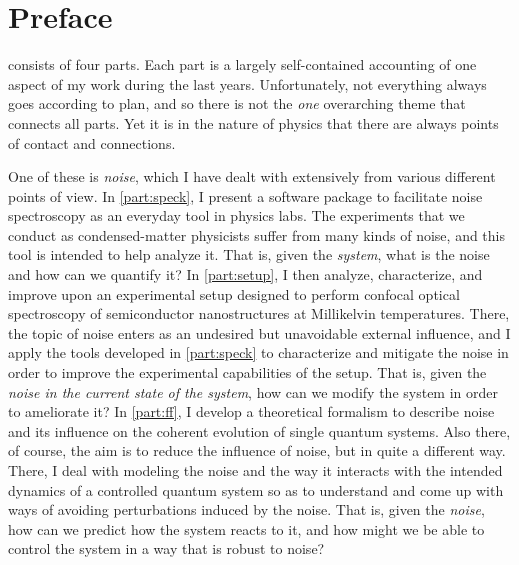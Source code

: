 \chapter*{Preface}

\Thethesis consists of four parts.
Each part is a largely self-contained accounting of one aspect of my work during the last years.
Unfortunately, not everything always goes according to plan, and so there is not the \emph{one} overarching theme that connects all parts.
Yet it is in the nature of physics that there are always points of contact and connections.

One of these is \emph{noise}, which I have dealt with extensively from various different points of view.
In \cref{part:speck}, I present a software package to facilitate noise spectroscopy as an everyday tool in physics labs.
The experiments that we conduct as condensed-matter physicists suffer from many kinds of noise, and this tool is intended to help analyze it.
That is, given the \emph{system}, what is the noise and how can we quantify it?
In \cref{part:setup}, I then analyze, characterize, and improve upon an experimental setup designed to perform confocal optical spectroscopy of semiconductor nanostructures at Millikelvin temperatures.
There, the topic of noise enters as an undesired but unavoidable external influence, and I apply the tools developed in \cref{part:speck} to characterize and mitigate the noise in order to improve the experimental capabilities of the setup.
That is, given the \emph{noise in the current state of the system}, how can we modify the system in order to ameliorate it?
In \cref{part:ff}, I develop a theoretical formalism to describe noise and its influence on the coherent evolution of single quantum systems.
Also there, of course, the aim is to reduce the influence of noise, but in quite a different way.
There, I deal with modeling the noise and the way it interacts with the intended dynamics of a controlled quantum system so as to understand and come up with ways of avoiding perturbations induced by the noise.
That is, given the \emph{noise}, how can we predict how the system reacts to it, and how might we be able to control the system in a way that is robust to noise?

